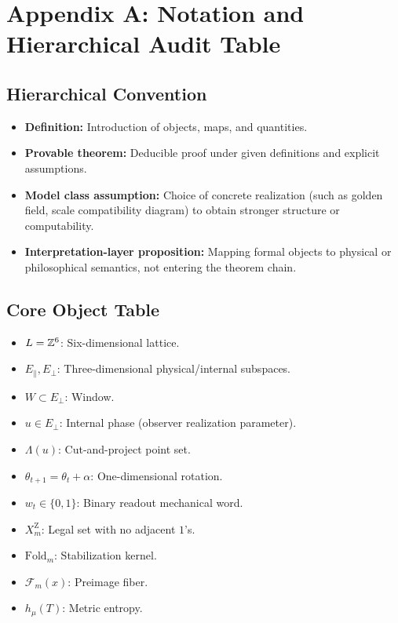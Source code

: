 \section{Appendix A: Notation and Hierarchical Audit Table}
\label{app:audit-table}

\subsection{Hierarchical Convention}

\begin{itemize}
  \item \textbf{Definition:} Introduction of objects, maps, and quantities.
  \item \textbf{Provable theorem:} Deducible proof under given definitions and explicit assumptions.
  \item \textbf{Model class assumption:} Choice of concrete realization (such as golden field, scale compatibility diagram) to obtain stronger structure or computability.
  \item \textbf{Interpretation-layer proposition:} Mapping formal objects to physical or philosophical semantics, not entering the theorem chain.
\end{itemize}

\subsection{Core Object Table}

\begin{itemize}
  \item $L=\mathbb{Z}^6$: Six-dimensional lattice.
  \item $E_{\parallel},E_{\perp}$: Three-dimensional physical/internal subspaces.
  \item $W\subset E_{\perp}$: Window.
  \item $u\in E_{\perp}$: Internal phase (observer realization parameter).
  \item $\Lambda(u)$: Cut-and-project point set.
  \item $\theta_{t+1}=\theta_t+\alpha$: One-dimensional rotation.
  \item $w_t\in\{0,1\}$: Binary readout mechanical word.
  \item $X_m^{\mathrm Z}$: Legal set with no adjacent $1$'s.
  \item $\mathrm{Fold}_m$: Stabilization kernel.
  \item $\mathcal{F}_m(x)$: Preimage fiber.
  \item $h_\mu(T)$: Metric entropy.
\end{itemize}
